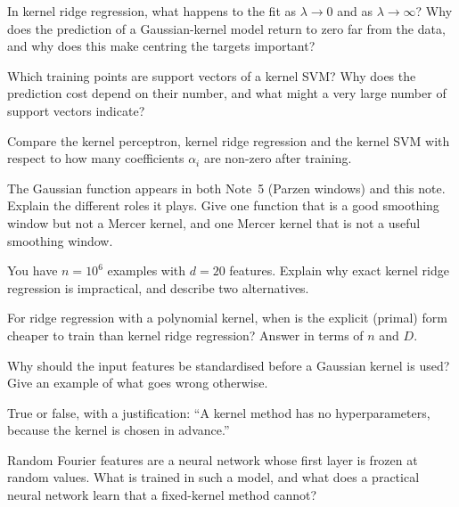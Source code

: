 \documentclass[11pt]{article}
\begin{document}
\begin{questions}
\begin{conceptual}
\item In kernel ridge regression, what happens to the fit as $\lambda \to 0$ and as $\lambda \to \infty$? Why does the
  prediction of a Gaussian-kernel model return to zero far from the data, and why does this make centring the targets
  important?
\item Which training points are support vectors of a kernel SVM? Why does the prediction cost depend on their number, and
  what might a very large number of support vectors indicate?
\item Compare the kernel perceptron, kernel ridge regression and the kernel SVM with respect to how many coefficients
  $\alpha_i$ are non-zero after training.
\item The Gaussian function appears in both Note~5 (Parzen windows) and this note. Explain the different roles it plays.
  Give one function that is a good smoothing window but not a Mercer kernel, and one Mercer kernel that is not a useful
  smoothing window.
\item You have $n = 10^6$ examples with $d = 20$ features. Explain why exact kernel ridge regression is impractical, and
  describe two alternatives.
\item For ridge regression with a polynomial kernel, when is the explicit (primal) form cheaper to train than kernel
  ridge regression? Answer in terms of $n$ and $D$.
\item Why should the input features be standardised before a Gaussian kernel is used? Give an example of what goes wrong
  otherwise.
\item True or false, with a justification: ``A kernel method has no hyperparameters, because the kernel is chosen in
  advance.''
\item Random Fourier features are a neural network whose first layer is frozen at random values. What is trained in such
  a model, and what does a practical neural network learn that a fixed-kernel method cannot?
\end{conceptual}


\end{questions}
\end{document}
